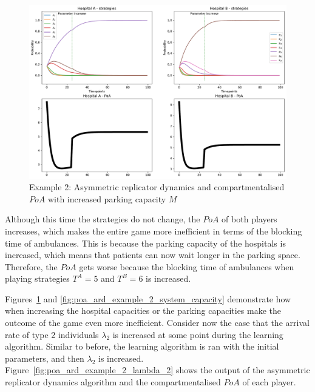 \begin{figure}[H]
    \centering
    \includegraphics[width=\linewidth]{chapters/05_numerical_results/Bin/example_2/poa_ard_example_2_parking_space.pdf}
    \caption{Example 2: Asymmetric replicator dynamics and compartmentalised
    \(PoA\) with increased parking capacity \(M\)}
    \label{fig:poa_ard_example_2_parking_capacity}
\end{figure}

Although this time the strategies do not change, the \(PoA\) of both players
increases, which makes the entire game more inefficient in terms of the
blocking time of ambulances.
This is because the parking capacity of the hospitals is increased, which means
that patients can now wait longer in the parking space.
Therefore, the \(PoA\) gets worse because the blocking time of ambulances
when playing strategies \(T^A = 5\) and \(T^B = 6\) is increased.

Figures~\ref{fig:poa_ard_example_2_parking_capacity} and
\ref{fig:poa_ard_example_2_system_capacity} demonstrate how when increasing
the hospital capacities or the parking capacities make the outcome of the game
even more inefficient.
Consider now the case that the arrival rate of type 2 individuals \(\lambda_2\)
is increased at some point during the learning algorithm.
Similar to before, the learning algorithm is ran with the initial parameters,
and then \(\lambda_2\) is increased.
Figure~\ref{fig:poa_ard_example_2_lambda_2} shows the output of the asymmetric
replicator dynamics algorithm and the compartmentalised \(PoA\) of each player.

